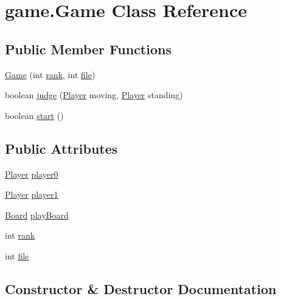 \hypertarget{classgame_1_1_game}{}\section{game.\+Game Class Reference}
\label{classgame_1_1_game}
\subsection*{Public Member Functions}
\begin{DoxyCompactItemize}
\item 
\mbox{\hyperlink{classgame_1_1_game_add3e226871fd6c2b2e9b2f2d4cee4e94}{Game}} (int \mbox{\hyperlink{classgame_1_1_game_a7b89934f8f5f80ac47eb7b55f643d081}{rank}}, int \mbox{\hyperlink{classgame_1_1_game_ae0ed20be94f9ee5b87550ae2576ce891}{file}})
\item 
boolean \mbox{\hyperlink{classgame_1_1_game_a4020b63689c4aaaa1b67dc458ff2fbee}{judge}} (\mbox{\hyperlink{classgame_1_1_player}{Player}} moving, \mbox{\hyperlink{classgame_1_1_player}{Player}} standing)
\item 
boolean \mbox{\hyperlink{classgame_1_1_game_a7f87abb7baa5fa13ac53da8f534f79bd}{start}} ()
\end{DoxyCompactItemize}
\subsection*{Public Attributes}
\begin{DoxyCompactItemize}
\item 
\mbox{\hyperlink{classgame_1_1_player}{Player}} \mbox{\hyperlink{classgame_1_1_game_a28888dea5fdb92292566492315e4d27b}{player0}}
\item 
\mbox{\hyperlink{classgame_1_1_player}{Player}} \mbox{\hyperlink{classgame_1_1_game_ae4a1dc482dba322c7a5d3955efe01c81}{player1}}
\item 
\mbox{\hyperlink{classgame_1_1_board}{Board}} \mbox{\hyperlink{classgame_1_1_game_ae5a12a35960e274e9eac5ac382beb1b3}{play\+Board}}
\item 
int \mbox{\hyperlink{classgame_1_1_game_a7b89934f8f5f80ac47eb7b55f643d081}{rank}}
\item 
int \mbox{\hyperlink{classgame_1_1_game_ae0ed20be94f9ee5b87550ae2576ce891}{file}}
\end{DoxyCompactItemize}


\subsection{Constructor \& Destructor Documentation}
\mbox{\label{classgame_1_1_game_add3e226871fd6c2b2e9b2f2d4cee4e94}} 
